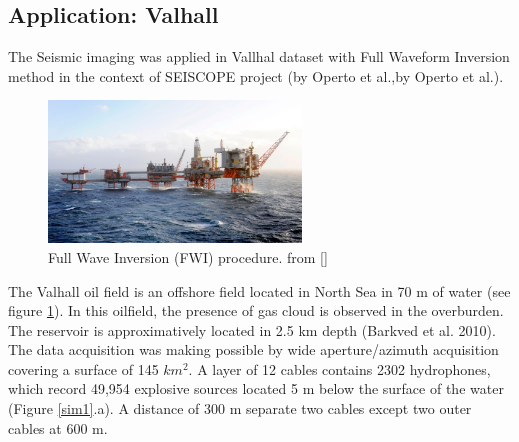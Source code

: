 \subsection{Application: Valhall}
The Seismic imaging was applied in Vallhal dataset with Full Waveform Inversion method in the context of SEISCOPE project (by Operto et al.,by Operto et al.).
\begin{figure}[!h]
\centering 
\includegraphics[width=0.6\textwidth]{images/valhall.jpg}
\caption{Full Wave Inversion (FWI) procedure. from []}
\label{valhall} 
\end{figure}
The Valhall oil field is an offshore field located in North Sea in 70 m of water (see figure \ref{valhall}). In this oilfield, the presence of gas cloud is observed in the overburden. The reservoir is approximatively located in 2.5 km depth (Barkved et al. 2010). The data acquisition was making possible by wide aperture/azimuth acquisition covering a surface of 145 $km^{2}$. A layer of 12 cables contains 2302 hydrophones,
which record 49,954 explosive sources located 5 m below the surface of the water (Figure \ref{sim1}.a). A distance of 300 m separate two cables except two outer cables at 600 m. 
